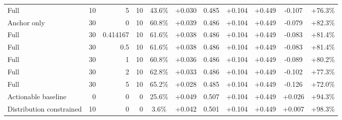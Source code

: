 \begin{table}[htbp]
\begin{tabular}{lrrrccccccc}
Full & 10 & 5 & 10 & 43.6\% & +0.030 & 0.485 & +0.104 & +0.449 & -0.107 & +76.3\% \\
Anchor only & 30 & 0 & 10 & 60.8\% & +0.039 & 0.486 & +0.104 & +0.449 & -0.079 & +82.3\% \\
Full & 30 & 0.414167 & 10 & 61.6\% & +0.038 & 0.486 & +0.104 & +0.449 & -0.083 & +81.4\% \\
Full & 30 & 0.5 & 10 & 61.6\% & +0.038 & 0.486 & +0.104 & +0.449 & -0.083 & +81.4\% \\
Full & 30 & 1 & 10 & 60.8\% & +0.036 & 0.486 & +0.104 & +0.449 & -0.089 & +80.2\% \\
Full & 30 & 2 & 10 & 62.8\% & +0.033 & 0.486 & +0.104 & +0.449 & -0.102 & +77.3\% \\
Full & 30 & 5 & 10 & 65.2\% & +0.028 & 0.485 & +0.104 & +0.449 & -0.126 & +72.0\% \\
Actionable baseline & 0 & 0 & 0 & 25.6\% & +0.049 & 0.507 & +0.104 & +0.449 & +0.026 & +94.3\% \\
Distribution constrained & 10 & 0 & 0 & 3.6\% & +0.042 & 0.501 & +0.104 & +0.449 & +0.007 & +98.3\% \\
\bottomrule
\end{tabular}
\end{table}